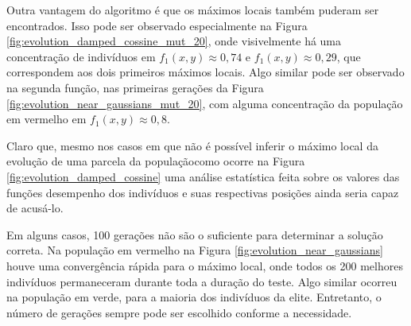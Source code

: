 Outra vantagem do algoritmo é que os máximos locais também puderam ser encontrados.
Isso pode ser observado especialmente na Figura \ref{fig:evolution_damped_cossine_mut_20},
onde visivelmente há uma concentração de indivíduos em $ f_1(x,y) \approx 0,74 $ e 
$ f_1(x,y) \approx 0,29 $, que correspondem aos dois primeiros máximos locais.
Algo similar pode ser observado na segunda função, nas primeiras gerações da Figura 
\ref{fig:evolution_near_gaussians_mut_20}, com alguma concentração da população em
vermelho em $f_1(x,y) \approx 0,8$.

Claro que, mesmo nos casos em que não é possível inferir o máximo local da evolução
de uma parcela da população\trav como ocorre na Figura \ref{fig:evolution_damped_cossine}\trav
uma análise estatística feita sobre os valores das funções desempenho dos indivíduos e
suas respectivas posições ainda seria capaz de acusá-lo.

Em alguns casos, 100 gerações não são o suficiente para determinar a solução correta. Na população
em vermelho na Figura \ref{fig:evolution_near_gaussians} houve uma convergência rápida para o
máximo local, onde todos os 200 melhores indivíduos permaneceram durante toda a duração do teste.
Algo similar ocorreu na população em verde, para a maioria dos indivíduos da elite. Entretanto, 
o número de gerações sempre pode ser escolhido conforme a necessidade.

